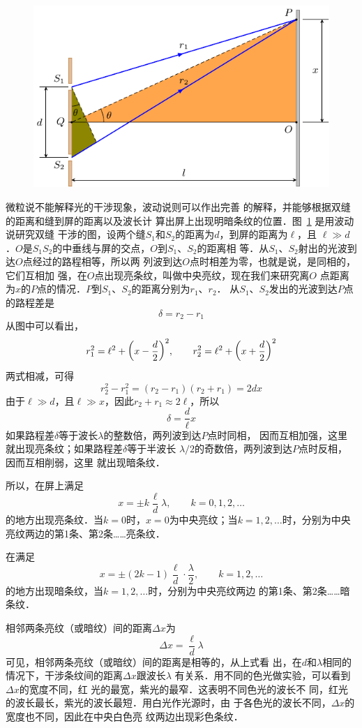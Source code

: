 \begin{figure}[htbp]
    \centering
    \includegraphics{fig/C/6-3.pdf}
    \caption{}\label{fig_C_6-3}
\end{figure}

微粒说不能解释光的干涉现象，波动说则可以作出完善
的解释，并能够根据双缝的距离和缝到屏的距离以及波长计
算出屏上出现明暗条纹的位置．图~\ref{fig_C_6-3} 是用波动说研究双缝
干涉的图，设两个缝$S_1$和$S_2$的距离为$d$，到屏的距离为$\ell$，且
$\ell\gg d$．$O$是$S_1S_2$的中垂线与屏的交点，$O$到$S_1$、$S_2$的距离相
等．从$S_1$、$S_2$射出的光波到达$O$点经过的路程相等，所以两
列波到达$O$点时相差为零，也就是说，是同相的，它们互相加
强，在$O$点出现亮条纹，叫做中央亮纹，现在我们来研究离$O$
点距离为$x$的$P$点的情况．$P$到$S_1$、$S_2$的距离分别为$r_1$、$r_2$．
从$S_1$、$S_2$发出的光波到达$P$点的路程差是
\[\delta =r_2-r_1 \]
从图中可以看出，
\[r^2_1=\ell^2+\qty(x-\frac{d}{2})^2,\qquad r^2_2=\ell^2+\qty(x+\frac{d}{2})^2  \]
两式相减，可得
\[r^2_2-r^2_1=(r_2-r_1)(r_2+r_1)=2dx\]
由于$\ell\gg d$，且$\ell\gg x$，因此$r_2+r_1\approx 2\ell$，所以
\[\delta=\frac{d}{\ell}x \]
如果路程差$\delta$等于波长$\lambda$的整数倍，两列波到达$P$点时同相，
因而互相加强，这里就出现亮条纹；如果路程差$\delta$等于半波长
$\lambda/2$的奇数倍，两列波到达$P$点时反相，因而互相削弱，这里
就出现暗条纹．

所以，在屏上满足
\[x=\pm k\frac{\ell}{d}\lambda, \qquad k=0,1,2,\ldots \]
的地方出现亮条纹．当$k=0$时，$x=0$为中央亮纹；当$k=1,
2,\ldots$时，分别为中央亮纹两边的第1条、第2条……亮条纹．

在满足
\[x=\pm(2k-1)\frac{\ell}{d}\cdot \frac{\lambda}{2},\qquad k=1,2,\ldots \]
的地方出现暗条纹，当$k=1,2,\ldots$时，分别为中央亮纹两边
的第1条、第2条……暗条纹．

相邻两条亮纹（或暗纹）间的距离$\Delta x$为
\[\Delta x=\frac{\ell}{d}\lambda \]
可见，相邻两条亮纹（或暗纹）间的距离是相等的，从上式看
出，在$d$和$\lambda$相同的情况下，干涉条纹间的距离$\Delta x$跟波长$\lambda$
有关系．用不同的色光做实验，可以看到$\Delta x$的宽度不同，红
光的最宽，紫光的最窄．这表明不同色光的波长不
同，红光的波长最长，紫光的波长最短．用白光作光源时，由
于各色光的波长不同，$\Delta x$的宽度也不同，因此在中央白色亮
纹两边出现彩色条纹．

